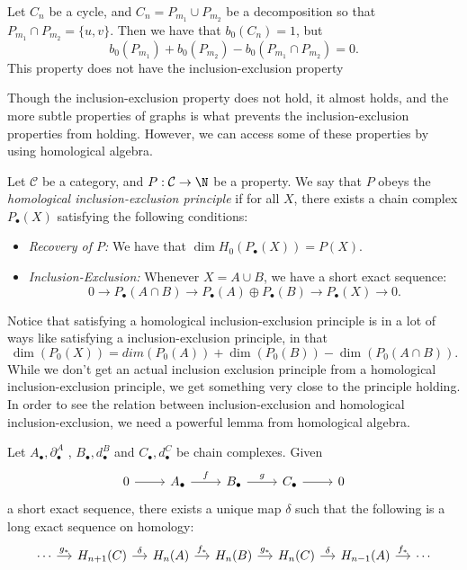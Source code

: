 \begin{example}
Let $C_n$ be a cycle, and $C_n=P_{m_1}\cup P_{m_2}$ be a decomposition so that $P_{m_1}\cap P_{m_2}=\{u,v\}. $ Then we have that $b_0(C_n)=1$, but 
\[b_0(P_{m_1})+b_0(P_{m_2})-b_0(P_{m_1}\cap P_{m_2})=0.\]
This property does not have the inclusion-exclusion property
\end{example}
Though the inclusion-exclusion property does not hold, it almost holds, and the more subtle properties of graphs is what prevents the inclusion-exclusion properties from holding. However, we can access some of these properties by using homological algebra. 
\begin{definition}
Let $\mathcal C$ be a category, and $P: \mathcal C\to \N$ be a property. We say that $P$ obeys the \emph{homological inclusion-exclusion principle} if for all $X$, there exists a chain complex $P_\bullet(X)$ satisfying the following conditions:
\begin{itemize}
\item \emph{Recovery of $P$:} We have that $\dim H_0(P_\bullet(X))=P(X).$
\item \emph{Inclusion-Exclusion:} Whenever $X=A\cup B$, we have a short exact sequence:
\[0\to P_\bullet(A\cap B)\to P_\bullet(A)\oplus P_\bullet(B)\to P_\bullet(X)\to 0.\]
\end{itemize}
\end{definition}
Notice that satisfying a homological inclusion-exclusion principle is in a lot of ways like satisfying a inclusion-exclusion principle, in that 
\[\dim(P_0(X))= dim (P_0(A))+\dim(P_0(B))-\dim(P_0(A\cap B)).\]
While we don't get an actual inclusion exclusion principle from a homological inclusion-exclusion principle, we get something very close to the principle holding. In order to see the relation between inclusion-exclusion and homological inclusion-exclusion, we need a powerful lemma from homological algebra. 
\begin{theorem}
Let $ A_\bullet,\partial^A_\bullet$ , $ B_\bullet,d^B_\bullet$ and $C_\bullet,d^C_\bullet$ be chain complexes. Given 
\[\begin{tikzcd} 0\arrow{r}&  A_\bullet \arrow{r}{f}& B_\bullet \arrow{r}{g} &C_\bullet \arrow{r} &0\end{tikzcd}\] a short exact sequence, there exists a unique map $\delta$ such that the following is a long exact sequence on homology:
\[\begin{tikzcd}[column sep=small] \cdots \arrow{r}{g_*}&H_{n+1}(C)\arrow{r}{\delta}& H_n ( A)\arrow{r}{f_*}& H_n( B)\arrow{r}{g_*}& H_n(C)\arrow{r}{\delta}& H_{n-1}( A)\arrow{r}{f_*}&\cdots \end{tikzcd}\] \label{lemma:zigzag}
\end{theorem}
